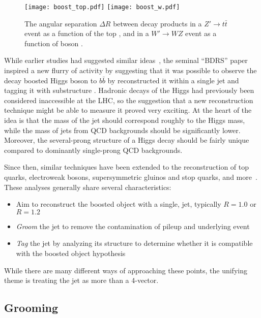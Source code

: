 
\begin{figure}
\centering
\texttt{[image: boost\_top.pdf]}
\texttt{[image: boost\_w.pdf]}
\label{fig:jets:boost}
\caption{The angular separation $\Delta R$ between decay products in a $Z'\rightarrow t\bar{t}$ event as a function of the top \pt, and in a $W'\rightarrow WZ$ event as a function of boson \pt.}
\end{figure}




While earlier studies had suggested similar ideas~, the seminal ``BDRS'' paper inspired a new flurry of activity by suggesting that it was possible to observe the decay boosted Higgs boson to $b\bar{b}$ by reconstructed  it within a single jet and tagging it with substructure \cite{BDRS}. Hadronic decays of the Higgs had previously been considered inaccessible at the LHC, so the suggestion that a new reconstruction technique might be able to measure it proved very exciting. At the heart of the idea is that the mass of the jet should correspond roughly to the Higgs mass, while the mass of jets from QCD backgrounds should be significantly lower. Moreover, the several-prong structure of a Higgs decay should be fairly unique compared to dominantly single-prong QCD backgrounds.

Since then, similar techniques have been extended to the reconstruction of top quarks, electroweak bosons, supersymmetric gluinos and stop quarks, and more~. These analyses generally share several characteristics:
%
\begin{itemize}
\item Aim to reconstruct the boosted object with a single, \largeR jet, typically $R=1.0$ or $R=1.2$
\item \textit{Groom} the jet to remove the contamination of pileup and underlying event 
\item \textit{Tag} the jet by analyzing its structure to determine whether it is compatible with the boosted object hypothesis
\end{itemize}
%
While there are many different ways of approaching these points, the unifying theme is treating the jet as more than a 4-vector. 

\subsection{Grooming}
\label{chapter:jets-and-substructure:grooming}

